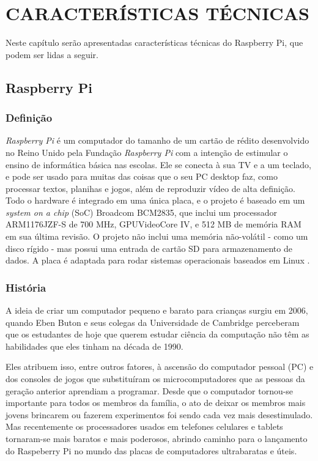 \chapter{CARACTERÍSTICAS TÉCNICAS}

Neste capítulo serão apresentadas características técnicas do Raspberry Pi, que podem ser lidas a seguir.

\section{Raspberry Pi}

\subsection{Definição}

\textit{Raspberry Pi} é um computador do tamanho de um cartão de  rédito desenvolvido no Reino Unido pela Fundação \textit{Raspberry Pi} com a intenção de estimular o ensino de informática básica nas escolas. Ele se conecta à sua TV e a um teclado, e pode ser usado para muitas das coisas que o seu PC desktop faz, como processar textos, planihas e jogos, além de reproduzir vídeo de alta definição. Todo o hardware é integrado em uma única placa, e o projeto é baseado em um \textit{system on a chip} (SoC) Broadcom BCM2835, que inclui um processador ARM1176JZF-S de 700 MHz, GPUVideoCore IV, e 512 MB de memória RAM em sua última revisão. O projeto não inclui uma memória não-volátil - como um disco rígido - mas possui uma entrada de cartão SD para armazenamento de dados. A placa é adaptada para rodar sistemas operacionais baseados em Linux \cite{WIKIPEDIA2}.

\subsection{História}

A ideia de criar um computador pequeno e barato para crianças surgiu em 2006, quando Eben Buton e seus colegas da Universidade de Cambridge perceberam que os estudantes de hoje que querem estudar ciência da computação não têm as habilidades que eles tinham na década de 1990.

Eles atribuem isso, entre outros fatores, à ascensão do computador pessoal (PC) e dos consoles de jogos que substituíram os microcomputadores que as pessoas da geração anterior aprendiam a programar. Desde que o computador tornou-se importante para todos os membros da família, o ato de deixar os membros mais jovens brincarem ou fazerem experimentos foi sendo cada vez mais desestimulado.
Mas recentemente os processadores usados em telefones celulares e tablets tornaram-se mais baratos e mais poderosos, abrindo caminho para o lançamento do Raspeberry Pi no mundo das placas de computadores ultrabaratas e úteis.

